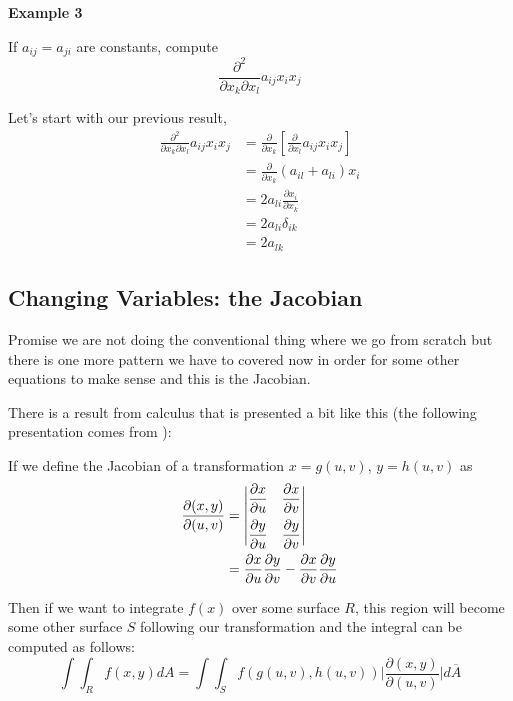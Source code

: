 \textbf{Example 3}

If $a_{ij} = a_{ji}$ are constants, compute
$$
\frac{\partial^2}{\partial x_k \partial x_l} a_{ij} x_i x_j
$$

Let's start with our previous result,
\begin{align*}
\frac{\partial^2}{\partial x_k \partial x_l} a_{ij} x_i x_j &=
    \frac{\partial}{\partial x_k} \left[ \frac{\partial}{\partial x_l} a_{ij} x_i x_j \right] \\
&= \frac{\partial}{\partial x_k} (a_{il} + a_{li}) x_i \\
&= 2 a_{li} \frac{\partial x_i}{\partial x_k} \\
&= 2 a_{li} \delta_{ik} \\
&= 2 a_{lk}
\end{align*}



\subsection{Changing Variables: the Jacobian}


Promise we are not doing the conventional thing where we go from scratch but there is one more pattern we have to covered
now in order for some other equations to make sense and this is the Jacobian.


There is a result from calculus that is presented a bit like this (the following presentation comes from
\cite{jacobian}):


If we define the Jacobian of a transformation $x = g(u,v)$, $y = h(u,v)$ as
\begin{align*}
\frac{ \partial (x,y) }{ \partial (u,v) } &= 
\begin{vmatrix}
\dfrac{ \partial x }{ \partial u } & \dfrac{ \partial x }{ \partial v } \\ \addlinespace
\dfrac{ \partial y }{ \partial u } & \dfrac{ \partial y }{ \partial v }
\end{vmatrix} \\
&= \frac{ \partial x }{ \partial u } \frac{ \partial y }{ \partial v } -
    \frac{ \partial x }{ \partial v }\frac{ \partial y }{ \partial u }
\end{align*}

Then if we want to integrate $f(x)$ over some surface $R$, this region will become some other surface $S$
following our transformation and the integral can be computed as follows:
$$
\int \int_{R} f(x,y) dA
= \int \int_{S} f\left( g(u,v), h(u,v) \right) \Biggl| \frac{ \partial (x,y) }{ \partial (u,v) } \Biggl| d\overline{A}
$$

